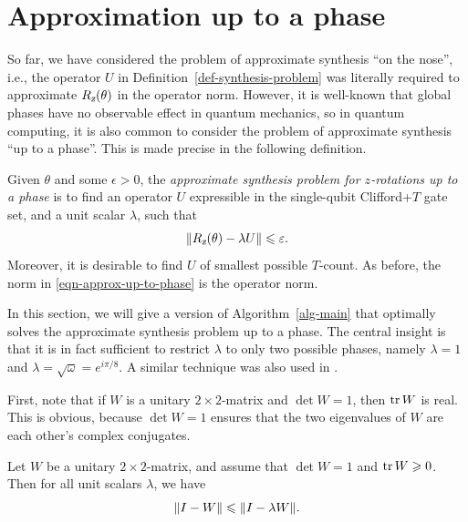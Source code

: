 \documentclass{article}
\begin{document}
\section{Approximation up to a phase}

So far, we have considered the problem of approximate synthesis ``on
the nose'', i.e., the operator $U$ in
Definition~\ref{def-synthesis-problem} was literally required to
approximate $R_{\textsl{z}}(\theta)$ in the operator norm.  However, it is
well-known that global phases have no observable effect in quantum
mechanics, so in quantum computing, it is also common to consider the
problem of approximate synthesis ``up to a phase''.  This is made
precise in the following definition.

\begin{definition}\label{def-approx-up-to-phase}
  Given $\theta$ and some $\epsilon>0$, the {\em approximate synthesis
    problem for $z$-rotations up to a phase} is to find an operator
  $U$ expressible in the single-qubit Clifford+$T$ gate set, and a
  unit scalar $\lambda$, such that
  \begin{equation}\label{eqn-approx-up-to-phase}
    \|R_{\textsl{z}}(\theta)-\lambda U\| \leqslant \varepsilon.
  \end{equation}
  Moreover, it is desirable to find $U$ of smallest possible
  $T$-count. As before, the norm in {\eqref{eqn-approx-up-to-phase}}
  is the operator norm.
\end{definition}

In this section, we will give a version of Algorithm~\ref{alg-main}
that optimally solves the approximate synthesis problem up to a phase.
The central insight is that it is in fact sufficient to restrict
$\lambda$ to only two possible phases, namely $\lambda=1$ and
$\lambda=\sqrt{\omega}=e^{i\pi/8}$. A similar technique was also used
in {\cite{KMM-practical}}.

First, note that if $W$ is a unitary $2\times 2$-matrix and $\det
W=1$, then $\mathop{{\rm tr}}\nolimits W$ is real. This is obvious, because $\det W=1$
ensures that the two eigenvalues of $W$ are each other's complex
conjugates.

\begin{lemma}\label{lem-IW}
  Let $W$ be a unitary $2\times 2$-matrix, and assume that $\det W =
  1$ and $\mathop{{\rm tr}}\nolimits W \geqslant 0$.  Then for all unit scalars $\lambda$, we have
  \[ \|I-W\| \leqslant \|I-\lambda W\|.
  \]
\end{lemma}
\end{document}
